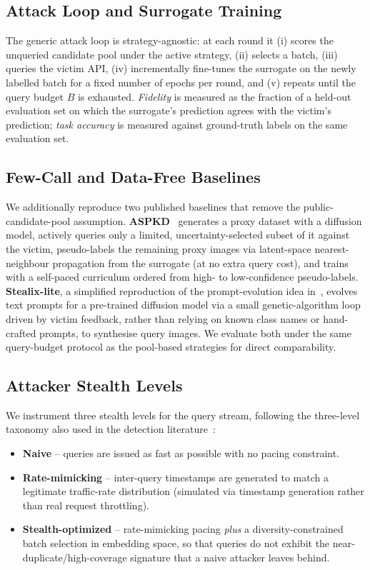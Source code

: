 \documentclass[journal,10pt]{IEEEtran}
\begin{document}
\subsection{Attack Loop and Surrogate Training}

The generic attack loop is strategy-agnostic: at each round it (i) scores the unqueried candidate
pool under the active strategy, (ii) selects a batch, (iii) queries the victim API, (iv)
incrementally fine-tunes the surrogate on the newly labelled batch for a fixed number of epochs
per round, and (v) repeats until the query budget $B$ is exhausted. \emph{Fidelity} is measured as
the fraction of a held-out evaluation set on which the surrogate's prediction agrees with the
victim's prediction; \emph{task accuracy} is measured against ground-truth labels on the same
evaluation set.

\subsection{Few-Call and Data-Free Baselines}

We additionally reproduce two published baselines that remove the public-candidate-pool assumption.
\textbf{ASPKD}~\cite{hondru2025aspkd} generates a proxy dataset with a diffusion model, actively
queries only a limited, uncertainty-selected subset of it against the victim, pseudo-labels the
remaining proxy images via latent-space nearest-neighbour propagation from the surrogate (at no
extra query cost), and trains with a self-paced curriculum ordered from high- to low-confidence
pseudo-labels. \textbf{Stealix-lite}, a simplified reproduction of the prompt-evolution idea
in~\cite{zhuang2025stealix}, evolves text prompts for a pre-trained diffusion model via a small
genetic-algorithm loop driven by victim feedback, rather than relying on known class names or
hand-crafted prompts, to synthesise query images. We evaluate both under the same query-budget
protocol as the pool-based strategies for direct comparability.

\subsection{Attacker Stealth Levels}
\label{sec:stealth}

We instrument three stealth levels for the query stream, following the three-level taxonomy also
used in the detection literature~\cite{zhou2024inversionguided}:
\begin{itemize}
\item \textbf{Naive} -- queries are issued as fast as possible with no pacing constraint.
\item \textbf{Rate-mimicking} -- inter-query timestamps are generated to match a legitimate
traffic-rate distribution (simulated via timestamp generation rather than real request throttling).
\item \textbf{Stealth-optimized} -- rate-mimicking pacing \emph{plus} a diversity-constrained batch
selection in embedding space, so that queries do not exhibit the near-duplicate/high-coverage
signature that a naive attacker leaves behind.
\end{itemize}
\end{document}
